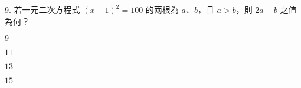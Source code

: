 \documentclass[12pt]{article}
\begin{document}
\begin{problem}
  \item[9.] 若一元二次方程式 $(x-1)^2 = 100$ 的兩根為 $a$、$b$，且 $a > b$，則 $2a + b$ 之值為何？
  \begin{choices}
    \item $9$
    \item $11$
    \item $13$
    \item $15$
  \end{choices}
\end{problem}
\end{document}

